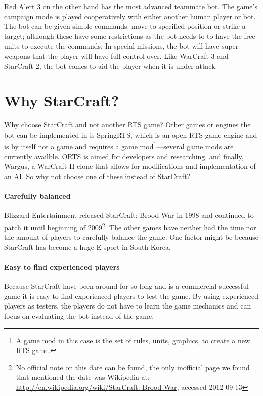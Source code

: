 Red Alert 3\cite{redalert3} on the other hand has the most advanced teammate bot. The game’s
campaign mode is played cooperatively with either another human player or bot. The bot can be given
simple commands: move to specified position or strike a target; although these have some
restrictions as the bot needs to to have the free units to execute the commands. In special
missions, the bot will have super weapons that the player will have full control over. Like WarCraft
3 and StarCraft 2, the bot comes to aid the player when it is under attack.

\section{Why StarCraft?} \label{sec:why_starcraft}	Why choose StarCraft and not another RTS game?
Other games or engines the bot can be implemented in is SpringRTS\cite{springrts}, which is an open RTS
game engine and is by itself not a game and requires a game mod\footnote{A game mod in this case is
the set of rules, units, graphics, to create a new RTS game.}—several game mods are currently availble.
ORTS\cite{orts} is aimed for developers and researching, and finally, Wargus\cite{wargus}, a
WarCraft II clone that allows for modifications and implementation of an AI. So why not choose one
of these instead of StarCraft?

\paragraph{Carefully balanced} Blizzard Entertainment released StarCraft: Brood War in 1998 and
continued to patch it until beginning of 2009\footnote{No official note on this date can be found,
the only inofficial page we found that mentioned the date was Wikipedia at:
\url{http://en.wikipedia.org/wiki/StarCraft: Brood War}, accessed 2012-09-13}. The other games have
neither had the time nor the amount of players to carefully balance the game. One factor might be
because StarCraft has become a huge E-sport in South Korea\cite{scKotakuKorea}.

\paragraph{Easy to find experienced players} Because StarCraft have been around for so long and is a
commercial successful game it is easy to find experienced players to test the game. By using
experienced players as testers, the players do not have to learn the game mechanics and can focus on
evaluating the bot instead of the game.

